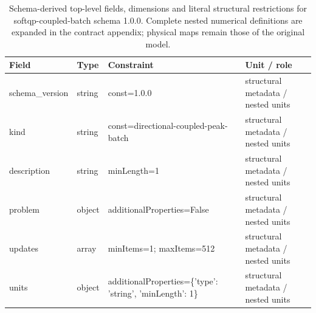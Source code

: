 \begin{table}[htbp]\centering\footnotesize
\caption{Schema-derived top-level fields, dimensions and literal structural restrictions for softqp-coupled-batch schema 1.0.0. Complete nested numerical definitions are expanded in the contract appendix; physical maps remain those of the original model.}\label{tab:contract-softqp-coupled-batch}
\begin{tabularx}{\textwidth}{@{}>{\raggedright\arraybackslash}p{}>{\raggedright\arraybackslash}p{}>{\raggedright\arraybackslash}X>{\raggedright\arraybackslash}X@{}}\toprule
Field & Type & Constraint & Unit / role\\\midrule
schema\_\allowbreak{}version & string & const=\allowbreak{}1.\allowbreak{}0.\allowbreak{}0 & structural metadata /\allowbreak{} nested units\\
kind & string & const=\allowbreak{}directional-\allowbreak{}coupled-\allowbreak{}peak-\allowbreak{}batch & structural metadata /\allowbreak{} nested units\\
description & string & minLength=\allowbreak{}1 & structural metadata /\allowbreak{} nested units\\
problem & object & additionalProperties=\allowbreak{}False & structural metadata /\allowbreak{} nested units\\
updates & array & minItems=\allowbreak{}1; maxItems=\allowbreak{}512 & structural metadata /\allowbreak{} nested units\\
units & object & additionalProperties=\allowbreak{}\{'type': 'string', 'minLength': 1\} & structural metadata /\allowbreak{} nested units\\
\bottomrule\end{tabularx}
\end{table}
